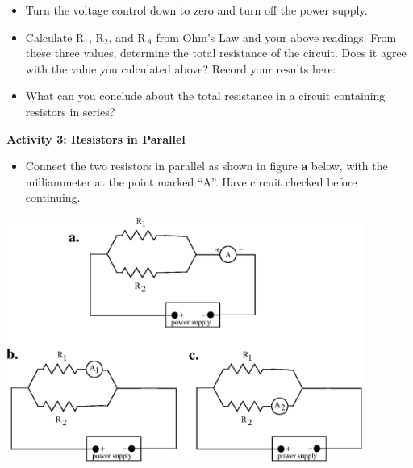 \begin{itemize}
\item Turn the voltage control down to zero and turn off the power supply.

\item Calculate R\( _{1} \), R\( _{2} \), and R\( _{A} \) from Ohm's Law and 
your above readings. From these three values, determine the total resistance of 
the circuit. Does it agree with the value you calculated above? Record your 
results here:
\vspace{20mm}

\item What can you conclude about the total resistance in a circuit 
containing resistors in series?\vspace{15mm}

\end{itemize}

\pagebreak

\textbf{Activity 3: Resistors in Parallel}

\begin{itemize}
\item Connect the two resistors in parallel as shown in figure \textbf{a} 
below, with the milliammeter at the point marked ``A''. Have circuit checked 
before continuing.
\end{itemize}
\vspace{0.3cm}
\begin{center}
\includegraphics[width=4.6in]{ohms_law/ohms_law_fig_2b.eps}
\end{center}
\vspace{0.3cm}

